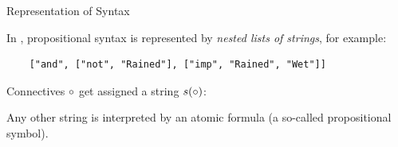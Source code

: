 \documentclass{beamer}
\begin{document}
    \begin{frame}[fragile]{Representation of Syntax}

        In \tnreason, propositional syntax is represented by \emph{nested lists of strings}, for example:
        \begin{verbatim}
    ["and", ["not", "Rained"], ["imp", "Rained", "Wet"]]
        \end{verbatim}
        \medskip

        Connectives $\circ$ get assigned a string $s(\circ)$:
        \begin{center}
        \end{center}

        Any other string is interpreted by an atomic formula (a so-called propositional symbol).

    \end{frame}
\end{document}
